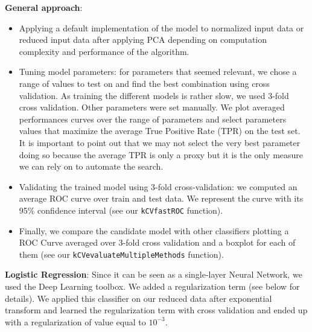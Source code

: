 \documentclass[10pt,a4paper]{article}
\begin{document}
  \textbf{General approach}:
   	\begin{itemize}
	   	\item Applying a default implementation of the model to normalized input data or reduced input data after applying PCA depending on computation complexity and performance of the algorithm.
    		\item Tuning model parameters: for parameters that seemed relevant, we chose a range of values to test on and find the best combination using cross validation. As training the different models is rather slow, we used 3-fold cross validation. Other parameters were set manually. We plot averaged performances curves over the range of parameters and select parameters values that maximize the average True Positive Rate (TPR) on the test set. It is important to point out that we may not select the very best parameter doing so because the average TPR is only a proxy but it is the only measure we can rely on to automate the search.
		  \item Validating the trained model using 3-fold cross-validation: we computed an average ROC curve over train and test data. We represent the curve with its 95\% confidence interval (see our \texttt{kCVfastROC} function).
  		\item Finally, we compare the candidate model with other classifiers plotting a ROC Curve averaged over 3-fold cross validation and a boxplot for each of them (see our \texttt{kCVevaluateMultipleMethods} function).\\
	\end{itemize}

  \textbf{Logistic Regression}: Since it can be seen as a single-layer Neural Network, we used the Deep Learning toolbox. We added a regularization term (see below for details). We applied this classifier on our reduced data after exponential transform and learned the regularization term with cross validation and ended up with a regularization of value equal to $10^{-3}$.\\
\end{document}
